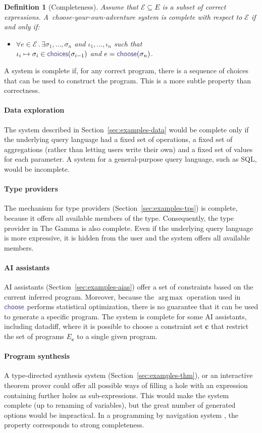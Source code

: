 \documentclass[nonacm,anonymous,sigplan,screen]{acmart}
\newcommand{\ident}[1]{\textsf{\color{DarkSlateBlue}{#1}}}
\newcommand{\select}{\textnormal{\ident{choose}}}
\newcommand{\choices}{\textnormal{\ident{choices}}}
\newcommand{\mparagraph}[1]{\vspace{-0.25em}\paragraph{#1}}
\DeclareMathOperator{\argmax}{arg\,max}
\newtheorem{definition}{Definition}
\begin{document}
\begin{definition}[Completeness]
Assume that $\mathcal{E}\subseteq E$ is a subset of correct expressions.
A~choose-your-own-adventure system is complete with respect to $\mathcal{E}$ if and only if:
\begin{itemize}
\item $\forall e \in \mathcal{E}\,.\,\exists \sigma_1, \ldots ,\sigma_n$ and $\iota_1, \ldots,\iota_n$ such that\\
  $\iota_i\mapsto\sigma_i \in \choices(\sigma_{i-1})$ and $e=\select(\sigma_n)$.
\end{itemize}
\end{definition}

A system is complete if, for any correct program, there is a sequence of choices that can be
used to construct the program. This is a more subtle property than correctness.

\mparagraph{Data exploration}
The system described in Section~\ref{sec:examples-data} would be complete
only if the underlying query language had a fixed set of operations, a fixed set of aggregations
(rather than letting users write their own) and a fixed set of values for each parameter.
A system for a general-purpose query language, such as SQL, would be incomplete.

\mparagraph{Type providers}
The mechanism for type providers (Section~\ref{sec:examples-tps}) is complete,
because it offers all available members of the type. Consequently, the type provider in The
Gamma is also complete. Even if the underlying query language is more expressive, it is hidden
from the user and the system offers all available members.

\mparagraph{AI assistants}
AI assistants (Section~\ref{sec:examples-aias}) offer a set of constraints based on the current inferred program.
Moreover, because the $\argmax$ operation used in $\select$ performs statistical
optimization, there is no guarantee that it can be used to generate a specific program.
The system is complete for some AI assistants, including datadiff, where it is possible to choose
a constraint set $\boldsymbol{c}$ that restrict the set of programs $E_{\boldsymbol{c}}$ to a
single given program.

\mparagraph{Program synthesis}
A type-directed synthesis system (Section~\ref{sec:examples-thm}), or an interactive theorem
prover could offer all possible ways of filling a hole with an expression containing further
holes as sub-expressions. This would make the system complete (up to renaming of variables),
but the great number of generated options would be impractical. In a programming by navigation
system \cite{lubin-2025-pbn}, the property corresponds to strong completeness.
\end{document}
